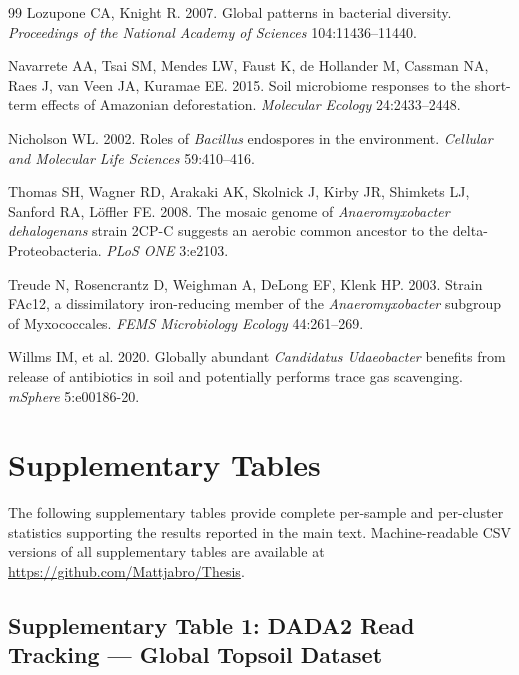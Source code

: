 \documentclass[12pt, oneside]{report}
\begin{document}
\begin{thebibliography}{99}
Lozupone CA, Knight R. 2007.
Global patterns in bacterial diversity.
\textit{Proceedings of the National Academy of Sciences} 104:11436--11440.

Navarrete AA, Tsai SM, Mendes LW, Faust K, de Hollander M, Cassman NA,
Raes J, van Veen JA, Kuramae EE. 2015.
Soil microbiome responses to the short-term effects of Amazonian deforestation.
\textit{Molecular Ecology} 24:2433--2448.

Nicholson WL. 2002.
Roles of \textit{Bacillus} endospores in the environment.
\textit{Cellular and Molecular Life Sciences} 59:410--416.

Thomas SH, Wagner RD, Arakaki AK, Skolnick J, Kirby JR, Shimkets LJ,
Sanford RA, L\"{o}ffler FE. 2008.
The mosaic genome of \textit{Anaeromyxobacter dehalogenans} strain 2CP-C
suggests an aerobic common ancestor to the delta-Proteobacteria.
\textit{PLoS ONE} 3:e2103.

Treude N, Rosencrantz D, Weighman A, DeLong EF, Klenk HP. 2003.
Strain FAc12, a dissimilatory iron-reducing member of the
\textit{Anaeromyxobacter} subgroup of Myxococcales.
\textit{FEMS Microbiology Ecology} 44:261--269.

Willms IM, et al. 2020.
Globally abundant \textit{Candidatus Udaeobacter} benefits from release of
antibiotics in soil and potentially performs trace gas scavenging.
\textit{mSphere} 5:e00186-20.

\end{thebibliography}


\appendix
\chapter{Supplementary Tables}
\label{app:supp}

The following supplementary tables provide complete per-sample and per-cluster statistics
supporting the results reported in the main text. Machine-readable CSV versions of all supplementary tables are available at \url{https://github.com/Mattjabro/Thesis}.

\newpage

\section*{Supplementary Table 1: DADA2 Read Tracking --- Global Topsoil Dataset}
\label{supp:tab1}
\end{document}
